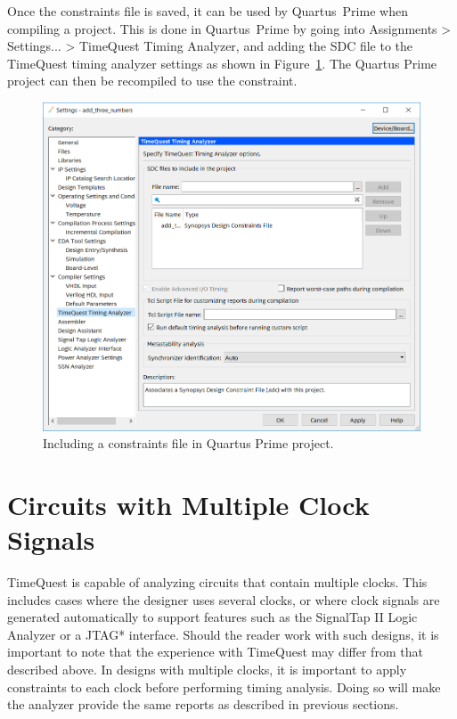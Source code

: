 \documentclass[11pt, twoside, pdftex]{article}
\begin{document}
Once the constraints file is saved, it can be used by Quartus~Prime when compiling a project. This 
is done in Quartus~Prime by going into {\sf Assignments > Settings... > TimeQuest Timing Analyzer}, 
and adding the SDC file to the TimeQuest timing analyzer settings as shown 
in Figure~\ref{fig:14}. The Quartus Prime project can then be recompiled to use the constraint.

\begin{figure}[H]
\begin{center}
\includegraphics[scale=0.55]{figures/figure14.png}
\end{center}
\caption{Including a constraints file in Quartus Prime project.}
\label{fig:14}
\end{figure}

\section{Circuits with Multiple Clock Signals}
\label{sec:mult}

TimeQuest is capable of analyzing circuits that contain multiple clocks. This includes cases where 
the designer uses several clocks, or where clock signals are generated automatically to 
support features such as the SignalTap II Logic Analyzer or a JTAG* interface. Should the reader 
work with such designs, it is important to note that the experience with TimeQuest may differ 
from that described above. In designs with multiple clocks, it is important to apply constraints
to each clock before performing timing analysis. Doing so will make the analyzer provide 
the same reports as described in previous sections.
\end{document}
